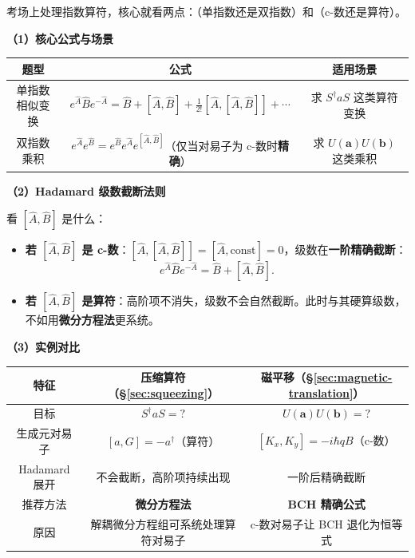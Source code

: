 考场上处理指数算符，核心就看两点：（单指数还是双指数）和（c-数还是算符）。

\textbf{（1）核心公式与场景}

\begin{center}
\renewcommand{\arraystretch}{1.5}
\begin{tabular}{|c|c|c|}
\hline
\textbf{题型} & \textbf{公式} & \textbf{适用场景} \\
\hline
单指数相似变换 & $e^{\hat{A}} \hat{B} e^{-\hat{A}} = \hat{B} + [\hat{A}, \hat{B}] + \frac{1}{2!}[\hat{A}, [\hat{A}, \hat{B}]] + \cdots$ & 求 $S^\dagger a S$ 这类算符变换 \\
\hline
双指数乘积 & $e^{\hat{A}} e^{\hat{B}} = e^{\hat{B}} e^{\hat{A}} e^{[\hat{A}, \hat{B}]}$（仅当对易子为 c-数时\textbf{精确}） & 求 $U(\bm{a})U(\bm{b})$ 这类乘积 \\
\hline
\end{tabular}
\end{center}

\textbf{（2）Hadamard 级数截断法则}

看 $[\hat{A}, \hat{B}]$ 是什么：
\begin{itemize}[nosep]
    \item \textbf{若 $[\hat{A}, \hat{B}]$ 是 c-数}：$[\hat{A}, [\hat{A}, \hat{B}]] = [\hat{A}, \text{const}] = 0$，级数在\textbf{一阶精确截断}：
    \[
    e^{\hat{A}} \hat{B} e^{-\hat{A}} = \hat{B} + [\hat{A}, \hat{B}].
    \]
    \item \textbf{若 $[\hat{A}, \hat{B}]$ 是算符}：高阶项不消失，级数不会自然截断。此时与其硬算级数，不如用\textbf{微分方程法}更系统。
\end{itemize}

\textbf{（3）实例对比}

\begin{center}
\renewcommand{\arraystretch}{1.4}
\begin{tabular}{|c|c|c|}
\hline
\textbf{特征} & \textbf{压缩算符（\S\ref{sec:squeezing}）} & \textbf{磁平移（\S\ref{sec:magnetic-translation}）} \\
\hline
目标 & $S^\dagger a S = ?$ & $U(\bm{a})U(\bm{b}) = ?$ \\
\hline
生成元对易子 & $[a, G] = -a^\dagger$（算符） & $[K_x, K_y] = -i\hbar qB$（c-数） \\
\hline
Hadamard 展开 & 不会截断，高阶项持续出现 & 一阶后精确截断 \\
\hline
推荐方法 & \textbf{微分方程法} & \textbf{BCH 精确公式} \\
\hline
原因 & 解耦微分方程组可系统处理算符对易子 & c-数对易子让 BCH 退化为恒等式 \\
\hline
\end{tabular}
\end{center}

